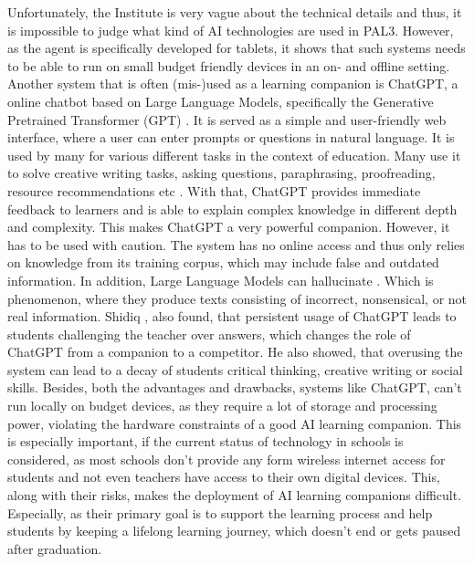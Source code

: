 \documentclass{Academic}
\begin{document}
    Unfortunately, the Institute is very vague about the technical details and thus, it is impossible to judge what kind of AI technologies are used in PAL3. However, as the agent is specifically developed for tablets, it shows that such systems needs to be able to run on small budget friendly devices in an on- and offline setting.\\
    Another system that is often (mis-)used as a learning companion is ChatGPT, a online chatbot based on Large Language Models, specifically the Generative Pretrained Transformer (GPT) \cite{shidiq_use_2023}. It is served as a simple and user-friendly web interface, where a user can enter prompts or questions in natural language. It is used by many for various different tasks in the context of education. Many use it to solve creative writing tasks, asking questions, paraphrasing, proofreading, resource recommendations etc \cite{shidiq_use_2023}. With that, ChatGPT provides immediate feedback to learners and is able to explain complex knowledge in different depth and complexity. This makes ChatGPT a very powerful companion. However, it has to be used with caution. The system has no online access and thus only relies on knowledge from its training corpus, which may include false and outdated information. In addition, Large Language Models can hallucinate \cite{tam_gentle_2023}. Which is phenomenon, where they produce texts consisting of incorrect, nonsensical, or not real information. Shidiq \cite{shidiq_use_2023}, also found, that persistent usage of ChatGPT leads to students challenging the teacher over answers, which changes the role of ChatGPT from a companion to a competitor. He also showed, that overusing the system can lead to a decay of students critical thinking, creative writing or social skills. Besides, both the advantages and drawbacks, systems like ChatGPT, can't run locally on budget devices, as they require a lot of storage and processing power, violating the hardware constraints of a good AI learning companion.
    This is especially important, if the current status of technology in schools is considered, as most schools don't provide any form wireless internet access for students and not even teachers have access to their own digital devices. This, along with their risks, makes the deployment of AI learning companions difficult. Especially, as their primary goal is to support the learning process and help students by keeping a lifelong learning journey, which doesn't end or gets paused after graduation.
\end{document}

